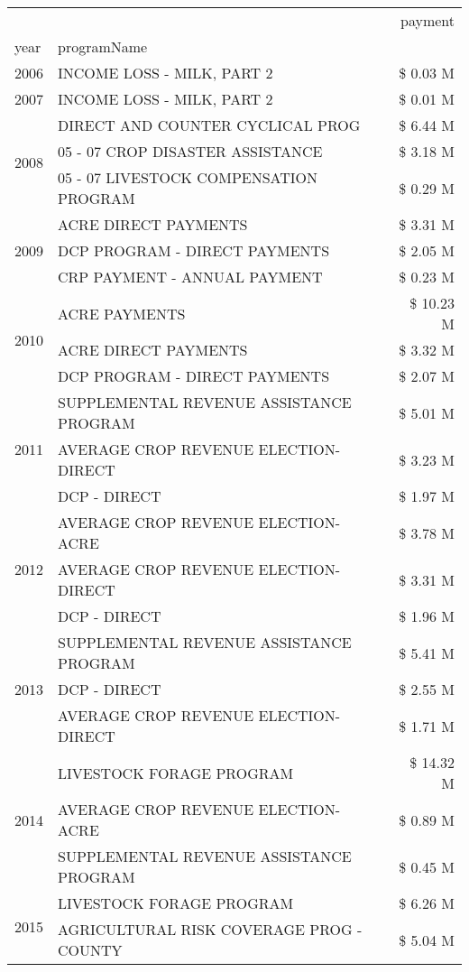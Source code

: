 \begin{tabular}{llr}
\toprule
 &  & payment \\
year & programName &  \\
\midrule
2006 & INCOME LOSS - MILK, PART 2 & \$ 0.03 M \\
\cline{1-3}
2007 & INCOME LOSS - MILK, PART 2 & \$ 0.01 M \\
\cline{1-3}
\multirow[t]{3}{*}{2008} & DIRECT AND COUNTER CYCLICAL PROG & \$ 6.44 M \\
 & 05 - 07 CROP DISASTER ASSISTANCE & \$ 3.18 M \\
 & 05 - 07 LIVESTOCK COMPENSATION PROGRAM & \$ 0.29 M \\
\cline{1-3}
\multirow[t]{3}{*}{2009} & ACRE DIRECT PAYMENTS & \$ 3.31 M \\
 & DCP PROGRAM - DIRECT PAYMENTS & \$ 2.05 M \\
 & CRP PAYMENT - ANNUAL PAYMENT & \$ 0.23 M \\
\cline{1-3}
\multirow[t]{3}{*}{2010} & ACRE PAYMENTS & \$ 10.23 M \\
 & ACRE DIRECT PAYMENTS & \$ 3.32 M \\
 & DCP PROGRAM - DIRECT PAYMENTS & \$ 2.07 M \\
\cline{1-3}
\multirow[t]{3}{*}{2011} & SUPPLEMENTAL REVENUE ASSISTANCE PROGRAM & \$ 5.01 M \\
 & AVERAGE CROP REVENUE ELECTION-DIRECT & \$ 3.23 M \\
 & DCP - DIRECT & \$ 1.97 M \\
\cline{1-3}
\multirow[t]{3}{*}{2012} & AVERAGE CROP REVENUE ELECTION-ACRE & \$ 3.78 M \\
 & AVERAGE CROP REVENUE ELECTION-DIRECT & \$ 3.31 M \\
 & DCP - DIRECT & \$ 1.96 M \\
\cline{1-3}
\multirow[t]{3}{*}{2013} & SUPPLEMENTAL REVENUE ASSISTANCE PROGRAM & \$ 5.41 M \\
 & DCP - DIRECT & \$ 2.55 M \\
 & AVERAGE CROP REVENUE ELECTION-DIRECT & \$ 1.71 M \\
\cline{1-3}
\multirow[t]{3}{*}{2014} & LIVESTOCK FORAGE PROGRAM & \$ 14.32 M \\
 & AVERAGE CROP REVENUE ELECTION-ACRE & \$ 0.89 M \\
 & SUPPLEMENTAL REVENUE ASSISTANCE PROGRAM & \$ 0.45 M \\
\cline{1-3}
\multirow[t]{3}{*}{2015} & LIVESTOCK FORAGE PROGRAM & \$ 6.26 M \\
 & AGRICULTURAL RISK COVERAGE PROG - COUNTY & \$ 5.04 M \\

\end{tabular}
